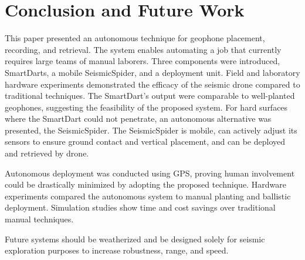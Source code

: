  \section{Conclusion and Future Work}\label{sec:Conclusion}
This paper presented an autonomous technique for geophone placement, recording, and retrieval. The system enables automating a job that currently requires large teams of manual laborers. Three components were introduced, SmartDarts, a mobile SeismicSpider, and a deployment unit.
Field and laboratory hardware experiments demonstrated the efficacy of the seismic drone compared to traditional techniques. 
The SmartDart's output were comparable to well-planted geophones, suggesting the feasibility of the proposed system. 
For hard surfaces where the SmartDart could not penetrate, an autonomous alternative was presented, the SeismicSpider.  
The SeismicSpider is mobile, can actively adjust its sensors to ensure ground contact and vertical placement, and can be deployed and retrieved by drone.

Autonomous deployment was conducted using GPS, proving human involvement could be drastically minimized by adopting the proposed technique. 
Hardware experiments compared the autonomous system to manual planting and ballistic deployment.
Simulation studies show time and cost savings over traditional manual techniques.

Future systems should be weatherized and be designed solely for seismic exploration purposes to increase robustness,  range, and speed.
